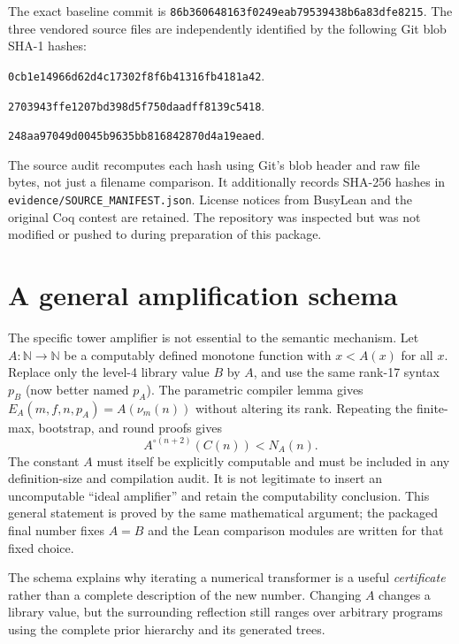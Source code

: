 \documentclass[11pt,letterpaper]{article}
\theoremstyle{definition}
\newcommand{\N}{\mathbb N}
\newcommand{\code}[1]{\nolinkurl{#1}}
\newcommand{\sourcecommit}{\texttt{86b360648163f0249eab79539438b6a83dfe8215}}
\begin{document}
The exact baseline commit is \sourcecommit. The three vendored source files
are independently identified by the following Git blob SHA-1 hashes:
\begin{description}[leftmargin=0pt,labelindent=0pt]
\item[Original language definitions]
\code{0cb1e14966d62d4c17302f8f6b41316fb4181a42}.
\item[Original reflection definitions]
\code{2703943ffe1207bd398d5f750daadff8139c5418}.
\item[Original Contender 6 definitions]
\code{248aa97049d0045b9635bb816842870d4a19eaed}.
\end{description}
The source audit recomputes each hash using Git's blob header and raw file
bytes, not just a filename comparison. It additionally records SHA-256 hashes
in \code{evidence/SOURCE_MANIFEST.json}. License notices from BusyLean and the
original Coq contest are retained. The repository was inspected but was not
modified or pushed to during preparation of this package.

\section{A general amplification schema}
\label{app:general}

The specific tower amplifier is not essential to the semantic mechanism.
Let $A:\N\to\N$ be a computably defined monotone function with $x<A(x)$ for
all $x$. Replace only the level-4 library value $B$ by $A$, and use the same
rank-17 syntax $p_B$ (now better named $p_A$). The parametric compiler lemma
gives $E_A(m,f,n,p_A)=A(\nu_m(n))$ without altering its rank. Repeating the
finite-max, bootstrap, and round proofs gives
\[
 A^{\circ(n+2)}(C(n))<N_A(n).
\]
The constant $A$ must itself be explicitly computable and must be included in
any definition-size and compilation audit. It is not legitimate to insert an
uncomputable ``ideal amplifier'' and retain the computability conclusion.
This general statement is proved by the same mathematical argument; the
packaged final number fixes $A=B$ and the Lean comparison modules are written
for that fixed choice.

The schema explains why iterating a numerical transformer is a useful
\emph{certificate} rather than a complete description of the new number.
Changing $A$ changes a library value, but the surrounding reflection still
ranges over arbitrary programs using the complete prior hierarchy and its
generated trees.
\end{document}
